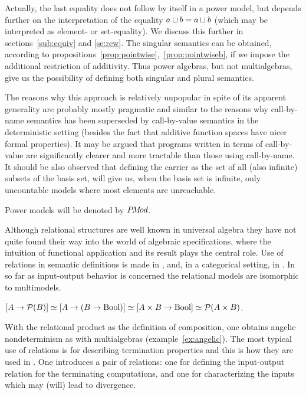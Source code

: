 Actually, the last equality does 
not follow by itself in a power model, but depends further on the 
interpretation of the equality $a\sqcup b = a\sqcup b$
 (which may be interpreted as element- or set-equality). We discuss 
this further in sections~\ref{sub:equiv} and \ref{se:rew}. The singular semantics can be obtained, 
according to propositions~\ref{prop:pointwise},~\ref{prop:pointwiseb}, 
if we impose the additional restriction of additivity. 
Thus power algebras, but not 
multialgebras, give us the possibility of defining both singular and 
plural semantics.


The reasons why this approach is relatively unpopular in spite of its 
apparent generality are probably mostly pragmatic and similar to the 
reasons why call-by-name semantics has been superseded by 
call-by-value semantics in the deterministic setting (besides the
fact that additive function spaces have nicer formal properties). It 
may be argued that programs written in terms of 
call-by-value are significantly clearer and more tractable 
than those using call-by-name. 
It should be also observed that defining the carrier as the set of all (also
infinite) subsets of the basis set, will give us, when the basis set is infinite, 
only uncountable models where most elements are 
unreachable.

Power models will be denoted by $P\!M\!od$.

Although relational structures are 
well known in  universal algebra \cite{c:27, c:80, c:79} they have not quite 
found their way into
 the world of algebraic specifications, where the intuition of 
functional application and its result plays the central role. Use of 
relations in semantic definitions is made in \cite{c:99, c:7, c:93, c:25, c:18}, 
and, in a categorical setting, in \cite{c:119}. In so far as input-output behavior 
is concerned the relational models are isomorphic 
to multimodels. 

\begin{Claim}\label{prop:29} 
$[A\mathrel{\rightarrow}{\cal P}(B)]\mathrel{\simeq} [A\mathrel{\rightarrow} (B\mathrel{\rightarrow} {\rm{Bool}})]\mathrel{\simeq} [A\times 
B\mathrel{\rightarrow}{\rm{Bool}}]\mathrel{\simeq} {\cal P}(A\times B)$.
\end{Claim}

\noindent
With the relational product as the definition of composition, one 
obtains angelic nondeterminism as with multialgebras 
(example~\ref{ex:angelic}). 
The most typical use of relations is for describing termination 
properties and this is how they are used in \cite{c:99, c:7, c:93, c:25, c:18}. 
One introduces a pair of relations: one for defining the 
input-output relation for the terminating computations, and one 
for characterizing the inputs which may (will) lead to divergence. 


